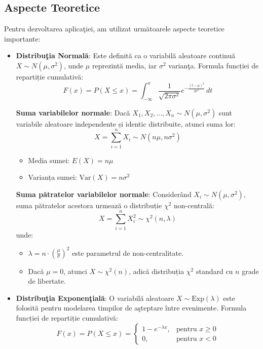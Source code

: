 \documentclass[a4paper,11pt]{article}
\begin{document}
\subsection*{Aspecte Teoretice}
Pentru dezvoltarea aplica\c{t}iei, am utilizat urm\u{a}toarele aspecte teoretice importante:

\begin{itemize}
  \item \textbf{Distribu\c{t}ia Normal\u{a}}: Este definit\u{a} ca o variabil\u{a} aleatoare continu\u{a} $X \sim N(\mu, \sigma^2)$, unde $\mu$ reprezint\u{a} media, iar $\sigma^2$ varian\c{t}a.
  \newline
  Formula funcției de repartiție cumulativă:
  \[
  F(x) = P(X \leq x) = \int_{-\infty}^{x} \frac{1}{\sqrt{2\pi \sigma^2}} e^{-\frac{(t - \mu)^2}{2\sigma^2}} \, dt
  \]

  \textbf{Suma variabilelor normale}:  
  Dacă $X_1, X_2, ..., X_n \sim N(\mu, \sigma^2)$ sunt variabile aleatoare independente și identic distribuite, atunci suma lor:
  \[
  X = \sum_{i=1}^{n} X_i \sim N(n\mu, n\sigma^2)
  \]
  \begin{itemize}
    \item Media sumei: $E(X) = n\mu$
    \item Varianța sumei: $\text{Var}(X) = n\sigma^2$
  \end{itemize}

  \textbf{Suma pătratelor variabilelor normale}:  
  Considerând $X_i \sim N(\mu, \sigma^2)$, suma pătratelor acestora urmează o distribuție $\chi^2$ non-centrală:
  \[
  X = \sum_{i=1}^{n} X_i^2 \sim \chi^2(n, \lambda)
  \]
  unde:
  \begin{itemize}
    \item $\lambda = n \cdot \left( \frac{\mu}{\sigma} \right)^2$ este parametrul de non-centralitate.
    \item Dacă $\mu = 0$, atunci $X \sim \chi^2(n)$, adică distribuția $\chi^2$ standard cu $n$ grade de libertate.
  \end{itemize}

  \item \textbf{Distribu\c{t}ia Exponen\c{t}ial\u{a}}: O variabil\u{a} aleatoare $X \sim \text{Exp}(\lambda)$ este folosit\u{a} pentru modelarea timpilor de a\c{s}teptare între evenimente.
  \newline
  Formula funcției de repartiție cumulativă:
  \[
  F(x) = P(X \leq x) = 
  \begin{cases}
  1 - e^{-\lambda x}, & \text{pentru } x \geq 0 \\
  0, & \text{pentru } x < 0
  \end{cases}
  \]


\end{itemize}
\end{document}
